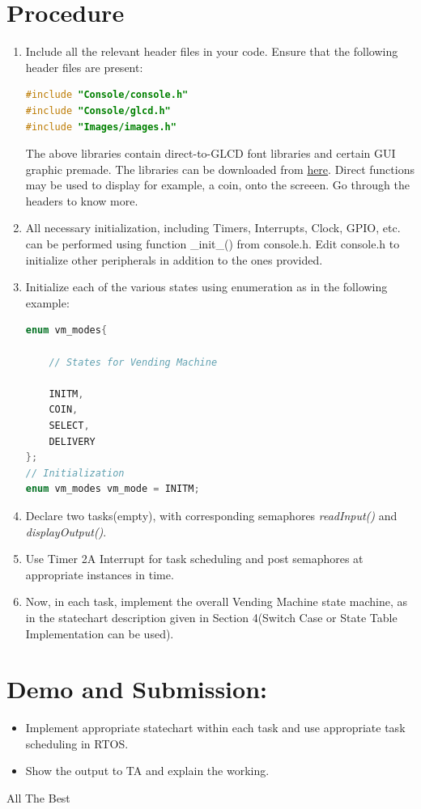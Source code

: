 \documentclass{article}
\begin{document}
\section{Procedure}
\begin{enumerate}
\item \qquad Include all the relevant header files in your code. Ensure that the following header
files are present:
\begin{lstlisting}[basicstyle = \small, language = C]
#include "Console/console.h"
#include "Console/glcd.h"
#include "Images/images.h"
\end{lstlisting}
\qquad The above libraries contain direct-to-GLCD font libraries and certain GUI graphic premade. The libraries can be downloaded from \href{https://github.com/eYSIP-2017/eYSIP-2017_Game_Development-TI-RTOS/blob/master/Documentation/VendingMachine/Console\%20Libraries.zip}{here}. Direct functions may be used to display for example, a coin, onto the screeen. Go through the headers to know more.
\item All necessary initialization, including Timers, Interrupts, Clock, GPIO, etc. can be performed using function \_init\_() from console.h. Edit console.h to initialize other peripherals in addition to the ones provided.
\item Initialize each of the various states using enumeration as in the following example:
\begin{lstlisting}[basicstyle = \small, language = C]
enum vm_modes{

    // States for Vending Machine

    INITM,
    COIN,
    SELECT,
    DELIVERY
};
// Initialization
enum vm_modes vm_mode = INITM;
\end{lstlisting}
\item Declare two tasks(empty), with corresponding semaphores \textit{readInput()} and \textit{displayOutput()}.
\item Use Timer 2A Interrupt for task scheduling and post semaphores at appropriate instances in time.
\item Now, in each task, implement the overall Vending Machine state machine, as in the statechart description given in Section 4(Switch Case or State Table Implementation can be used).
\end{enumerate}
\section{Demo and Submission:}
\begin{itemize}
    \item Implement appropriate statechart within each task and use appropriate task scheduling in RTOS.
    \item Show the output to TA and explain the working.
\end{itemize}
\begin{center}
\newline
   All The Best

 \end{center}
\end{document}
